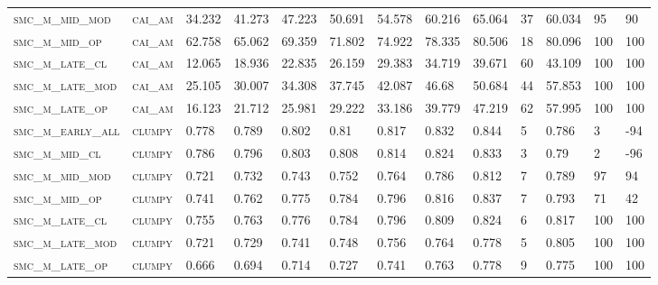 \begin{landscape}
\begin{center}
\begin{footnotesize}
\begin{longtable}{lllllllllllll}
\textsc{smc\_m\_mid\_mod  } & \textsc{cai\_am   }   & 34.232   & 41.273   & 47.223   & 50.691   & 54.578   & 60.216   & 65.064   & 37     & 60.034        & 95            & 90       \\
\textsc{smc\_m\_mid\_op   } & \textsc{cai\_am   }   & 62.758   & 65.062   & 69.359   & 71.802   & 74.922   & 78.335   & 80.506   & 18     & 80.096        & 100           & 100      \\
\textsc{smc\_m\_late\_cl  } & \textsc{cai\_am   }   & 12.065   & 18.936   & 22.835   & 26.159   & 29.383   & 34.719   & 39.671   & 60     & 43.109        & 100           & 100      \\
\textsc{smc\_m\_late\_mod } & \textsc{cai\_am   }   & 25.105   & 30.007   & 34.308   & 37.745   & 42.087   & 46.68    & 50.684   & 44     & 57.853        & 100           & 100      \\
\textsc{smc\_m\_late\_op  } & \textsc{cai\_am   }   & 16.123   & 21.712   & 25.981   & 29.222   & 33.186   & 39.779   & 47.219   & 62     & 57.995        & 100           & 100      \\
\textsc{smc\_m\_early\_all} & \textsc{clumpy    }   & 0.778    & 0.789    & 0.802    & 0.81     & 0.817    & 0.832    & 0.844    & 5      & 0.786         & 3             & -94      \\
\textsc{smc\_m\_mid\_cl   } & \textsc{clumpy    }   & 0.786    & 0.796    & 0.803    & 0.808    & 0.814    & 0.824    & 0.833    & 3      & 0.79          & 2             & -96      \\
\textsc{smc\_m\_mid\_mod  } & \textsc{clumpy    }   & 0.721    & 0.732    & 0.743    & 0.752    & 0.764    & 0.786    & 0.812    & 7      & 0.789         & 97            & 94       \\
\textsc{smc\_m\_mid\_op   } & \textsc{clumpy    }   & 0.741    & 0.762    & 0.775    & 0.784    & 0.796    & 0.816    & 0.837    & 7      & 0.793         & 71            & 42       \\
\textsc{smc\_m\_late\_cl  } & \textsc{clumpy    }   & 0.755    & 0.763    & 0.776    & 0.784    & 0.796    & 0.809    & 0.824    & 6      & 0.817         & 100           & 100      \\
\textsc{smc\_m\_late\_mod } & \textsc{clumpy    }   & 0.721    & 0.729    & 0.741    & 0.748    & 0.756    & 0.764    & 0.778    & 5      & 0.805         & 100           & 100      \\
\textsc{smc\_m\_late\_op  } & \textsc{clumpy    }   & 0.666    & 0.694    & 0.714    & 0.727    & 0.741    & 0.763    & 0.778    & 9      & 0.775         & 100           & 100      \\

\end{longtable}
\end{footnotesize}
\end{center}
\end{landscape}
